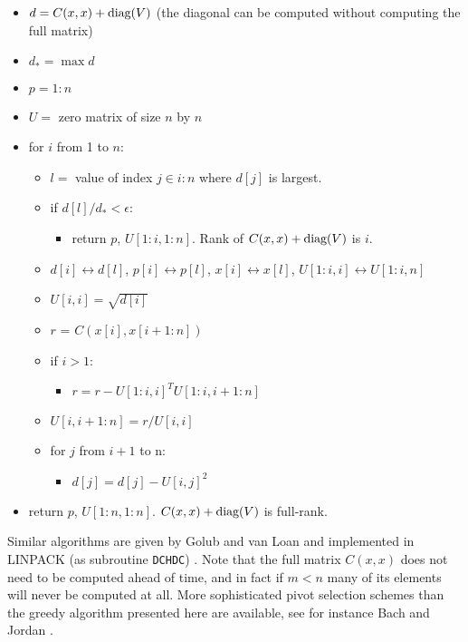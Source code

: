 \documentclass{report}
\begin{document}
\begin{itemize}
    \item $d = C(x,x)+\textup{diag}(V)$ (the diagonal can be computed without computing the full matrix)
    \item $d_* = \max d$
    \item $p=1:n$
    \item $U=$ zero matrix of size $n$ by $n$
    \item for $i$ from 1 to $n$:
    \begin{itemize}
        \item $l=$ value of index $j\in i:n$ where $d[j]$ is largest.
        \item if $d[l] / d_*<\epsilon$:
        \begin{itemize}
            \item return $p$, $U[1:i, 1:n]$. Rank of $C(x,x) + \textup{diag}(V)$ is $i$.
        \end{itemize}
        \item $d[i] \leftrightarrow d[l]$, $p[i] \leftrightarrow p[l]$, $x[i] \leftrightarrow x[l]$, $U[1:i,i] \leftrightarrow U[1:i,n]$
        \item $U[i,i]=\sqrt {d[i]}$
        \item $r$ = $C(x[i], x[i+1:n])$
        \item if $i>1$:
        \begin{itemize}
            \item $r=r-U[1:i,i]^T U[1:i,i+1:n]$
        \end{itemize}
        \item $U[i,i+1:n] = r / U[i,i]$
        \item for $j$ from $i+1$ to n:
        \begin{itemize}
            \item $d[j] = d[j] - U[i,j]^2$
        \end{itemize}
    \end{itemize}
    \item return $p$, $U[1:n, 1:n]$. $C(x,x) + \textup{diag}(V)$ is full-rank.
\end{itemize}
Similar algorithms are given by Golub and van Loan \cite{golub} and implemented in LINPACK (as subroutine \texttt{DCHDC}) \cite{Linpack}. Note that the full matrix $C(x,x)$ does not need to be computed ahead of time, and in fact if $m<n$ many of its elements will never be computed at all. More sophisticated pivot selection schemes than the greedy algorithm presented here are available, see for instance Bach and Jordan \cite{predictivechol}.
\end{document}
